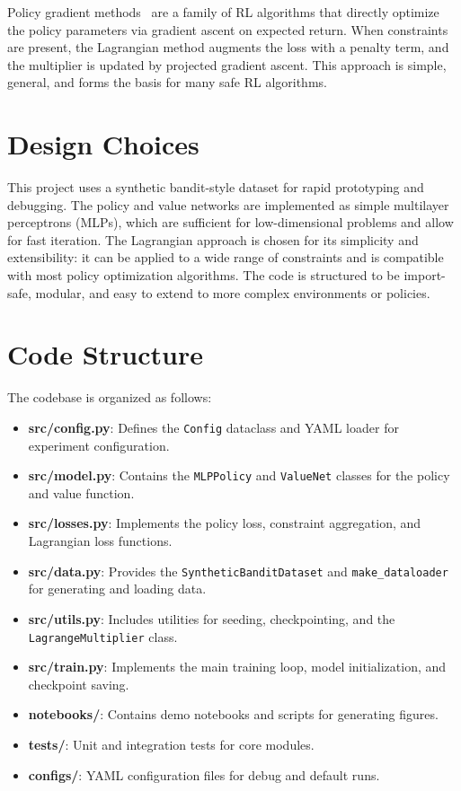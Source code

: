 Policy gradient methods~\cite{sutton2018reinforcement,schulman2015trust} are a family of RL algorithms that directly optimize the policy parameters via gradient ascent on expected return. When constraints are present, the Lagrangian method augments the loss with a penalty term, and the multiplier is updated by projected gradient ascent. This approach is simple, general, and forms the basis for many safe RL algorithms.

\section{Design Choices}
This project uses a synthetic bandit-style dataset for rapid prototyping and debugging. The policy and value networks are implemented as simple multilayer perceptrons (MLPs), which are sufficient for low-dimensional problems and allow for fast iteration. The Lagrangian approach is chosen for its simplicity and extensibility: it can be applied to a wide range of constraints and is compatible with most policy optimization algorithms. The code is structured to be import-safe, modular, and easy to extend to more complex environments or policies.

\section{Code Structure}
The codebase is organized as follows:
\begin{itemize}
  \item \textbf{src/config.py}: Defines the \texttt{Config} dataclass and YAML loader for experiment configuration.
  \item \textbf{src/model.py}: Contains the \texttt{MLPPolicy} and \texttt{ValueNet} classes for the policy and value function.
  \item \textbf{src/losses.py}: Implements the policy loss, constraint aggregation, and Lagrangian loss functions.
  \item \textbf{src/data.py}: Provides the \texttt{SyntheticBanditDataset} and \texttt{make_dataloader} for generating and loading data.
  \item \textbf{src/utils.py}: Includes utilities for seeding, checkpointing, and the \texttt{LagrangeMultiplier} class.
  \item \textbf{src/train.py}: Implements the main training loop, model initialization, and checkpoint saving.
  \item \textbf{notebooks/}: Contains demo notebooks and scripts for generating figures.
  \item \textbf{tests/}: Unit and integration tests for core modules.
  \item \textbf{configs/}: YAML configuration files for debug and default runs.
\end{itemize}

